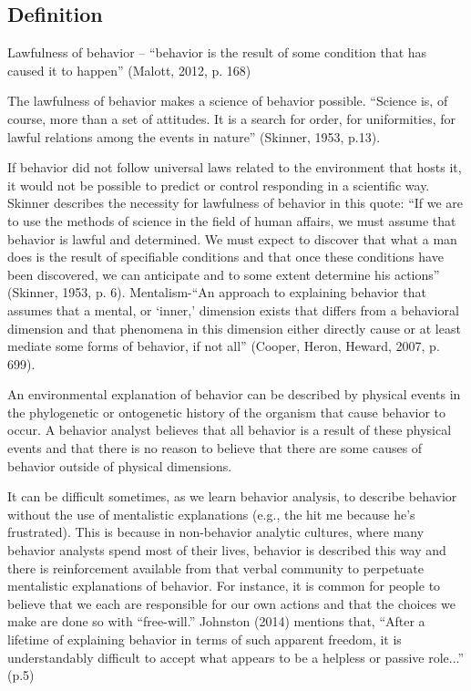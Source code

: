 \subsection{Definition}
Lawfulness of behavior – ``behavior is the result of some condition that has caused it to happen'' (Malott, 2012, p. 168)

The lawfulness of behavior makes a science of behavior possible. ``Science is, of course, more than a set of attitudes. It is a search for order, for uniformities, for lawful relations among the events in nature'' (Skinner, 1953, p.13).

If behavior did not follow universal laws related to the environment that hosts it, it would not be possible to predict or control responding in a scientific way. Skinner describes the necessity for lawfulness of behavior in this quote: ``If we are to use the methods of science in the field of human affairs, we must assume that behavior is lawful and determined. We must expect to discover that what a man does is the result of specifiable conditions and that once these conditions have been discovered, we can anticipate and to some extent determine his actions'' (Skinner, 1953, p. 6).
%
Mentalism-``An approach to explaining behavior that assumes that a mental, or ‘inner,' dimension exists that differs from a behavioral dimension and that phenomena in this dimension either directly cause or at least mediate some forms of behavior, if not all'' (Cooper, Heron, Heward, 2007, p. 699).

An environmental explanation of behavior can be described by physical events in the phylogenetic or ontogenetic history of the organism that cause behavior to occur. A behavior analyst believes that all behavior is a result of these physical events and that there is no reason to believe that there are some causes of behavior outside of physical dimensions.

It can be difficult sometimes, as we learn behavior analysis, to describe behavior without the use of mentalistic explanations (e.g., the hit me because he's frustrated). This is because in non-behavior analytic cultures, where many behavior analysts spend most of their lives, behavior is described this way and there is reinforcement available from that verbal community to perpetuate mentalistic explanations of behavior. For instance, it is common for people to believe that we each are responsible for our own actions and that the choices we make are done so with ``free-will.''  Johnston (2014) mentions that, ``After a lifetime of explaining behavior in terms of such apparent freedom, it is understandably difficult to accept what appears to be a helpless or passive role...'' (p.5) 


